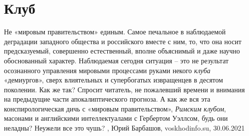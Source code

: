 
 
 
 
 
\chapter{Клуб}
\label{sec:slova.klub}

Не «мировым правительством» единым.  Самое печальное в наблюдаемой деградации
западного общества и российского вместе с ним, то, что она носит предсказуемый,
совершенно естественный, вполне объяснимый и даже научно обоснованный характер.
Наблюдаемая сегодня ситуация – это не результат осознанного управления мировыми
процессами руками некого \emph{клуба} «демиургов», сверх влиятельных и
супербогатых извращенцев в десятом поколении.  Как же так? Спросит читатель, не
пожалевший времени и внимания на предыдущие части апокалиптического прогноза. А
как же вся эта конспирологическая дичь с «мировым правительством»,
\emph{Римским клубом}, масонами и английскими интеллектуалами с Гербертом
Уэллсом, будь они неладны? Неужели все это чушь?
, 
Юрий Барбашов, voskhodinfo.su, 30.06.2021
